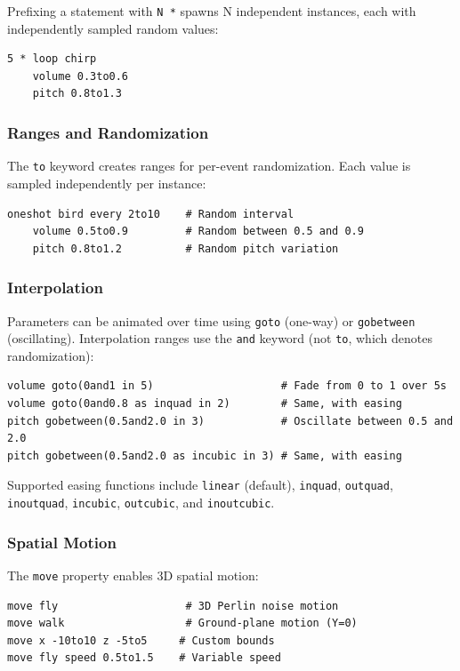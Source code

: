 \documentclass[sigconf,anonymous,review]{nimeart}
\begin{document}
Prefixing a statement with \texttt{N *} spawns N independent instances, each with independently sampled random values:

\begin{lstlisting}[language=satie]
5 * loop chirp
    volume 0.3to0.6
    pitch 0.8to1.3
\end{lstlisting}

\subsubsection{Ranges and Randomization}

The \texttt{to} keyword creates ranges for per-event randomization. Each value is sampled independently per instance:

\begin{lstlisting}[language=satie]
oneshot bird every 2to10    # Random interval
    volume 0.5to0.9         # Random between 0.5 and 0.9
    pitch 0.8to1.2          # Random pitch variation
\end{lstlisting}

\subsubsection{Interpolation}

Parameters can be animated over time using \texttt{goto} (one-way) or \texttt{gobetween} (oscillating). Interpolation ranges use the \texttt{and} keyword (not \texttt{to}, which denotes randomization):

\begin{lstlisting}[language=satie]
volume goto(0and1 in 5)                    # Fade from 0 to 1 over 5s
volume goto(0and0.8 as inquad in 2)        # Same, with easing
pitch gobetween(0.5and2.0 in 3)            # Oscillate between 0.5 and 2.0
pitch gobetween(0.5and2.0 as incubic in 3) # Same, with easing
\end{lstlisting}

Supported easing functions include \texttt{linear} (default), \texttt{inquad}, \texttt{outquad}, \texttt{inoutquad}, \texttt{incubic}, \texttt{outcubic}, and \texttt{inoutcubic}.

\subsubsection{Spatial Motion}

The \texttt{move} property enables 3D spatial motion:

\begin{lstlisting}[language=satie]
move fly                    # 3D Perlin noise motion
move walk                   # Ground-plane motion (Y=0)
move x -10to10 z -5to5     # Custom bounds
move fly speed 0.5to1.5    # Variable speed
\end{lstlisting}
\end{document}
